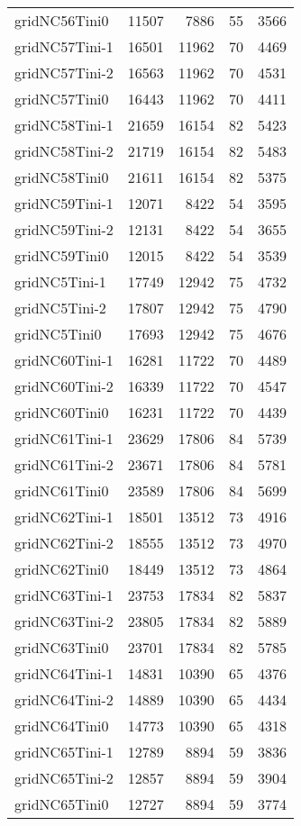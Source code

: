 \begin{tabular}{lrrrr}
gridNC56Tini0 & 11507 & 7886 & 55 & 3566 \\
gridNC57Tini-1 & 16501 & 11962 & 70 & 4469 \\
gridNC57Tini-2 & 16563 & 11962 & 70 & 4531 \\
gridNC57Tini0 & 16443 & 11962 & 70 & 4411 \\
gridNC58Tini-1 & 21659 & 16154 & 82 & 5423 \\
gridNC58Tini-2 & 21719 & 16154 & 82 & 5483 \\
gridNC58Tini0 & 21611 & 16154 & 82 & 5375 \\
gridNC59Tini-1 & 12071 & 8422 & 54 & 3595 \\
gridNC59Tini-2 & 12131 & 8422 & 54 & 3655 \\
gridNC59Tini0 & 12015 & 8422 & 54 & 3539 \\
gridNC5Tini-1 & 17749 & 12942 & 75 & 4732 \\
gridNC5Tini-2 & 17807 & 12942 & 75 & 4790 \\
gridNC5Tini0 & 17693 & 12942 & 75 & 4676 \\
gridNC60Tini-1 & 16281 & 11722 & 70 & 4489 \\
gridNC60Tini-2 & 16339 & 11722 & 70 & 4547 \\
gridNC60Tini0 & 16231 & 11722 & 70 & 4439 \\
gridNC61Tini-1 & 23629 & 17806 & 84 & 5739 \\
gridNC61Tini-2 & 23671 & 17806 & 84 & 5781 \\
gridNC61Tini0 & 23589 & 17806 & 84 & 5699 \\
gridNC62Tini-1 & 18501 & 13512 & 73 & 4916 \\
gridNC62Tini-2 & 18555 & 13512 & 73 & 4970 \\
gridNC62Tini0 & 18449 & 13512 & 73 & 4864 \\
gridNC63Tini-1 & 23753 & 17834 & 82 & 5837 \\
gridNC63Tini-2 & 23805 & 17834 & 82 & 5889 \\
gridNC63Tini0 & 23701 & 17834 & 82 & 5785 \\
gridNC64Tini-1 & 14831 & 10390 & 65 & 4376 \\
gridNC64Tini-2 & 14889 & 10390 & 65 & 4434 \\
gridNC64Tini0 & 14773 & 10390 & 65 & 4318 \\
gridNC65Tini-1 & 12789 & 8894 & 59 & 3836 \\
gridNC65Tini-2 & 12857 & 8894 & 59 & 3904 \\
gridNC65Tini0 & 12727 & 8894 & 59 & 3774 \\

\end{tabular}
